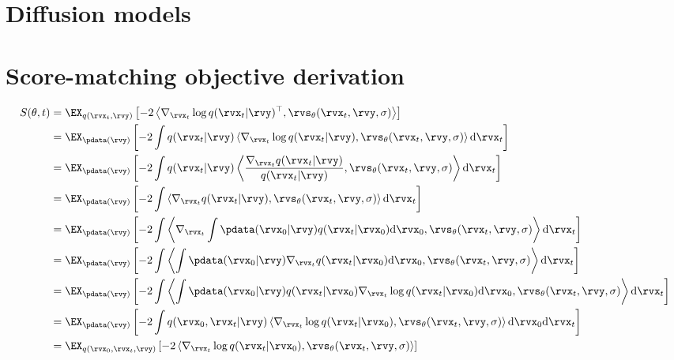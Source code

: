 \chapter{Diffusion models}

\chapter{Score-matching objective derivation} \label{sec:proof-that-diffusion-does-score-matching}

\begin{align}
\allowdisplaybreaks
S(\theta, t) &= \EX_{q(\rvx_t, \rvy)} \left[ - 2 \left\langle \nabla_{\rvx_t} \log q(\rvx_t|\rvy)^\top, \rvs_\theta(\rvx_t, \rvy, \sigma) \right\rangle \right] \\
    &= \EX_{\pdata(\rvy)}\left[  - 2 \int q(\rvx_t | \rvy) \left\langle \nabla_{\rvx_t} \log q(\rvx_t | \rvy), \rvs_\theta(\rvx_t, \rvy, \sigma) \right\rangle \mathrm{d} \rvx_t \right] \\
    &= \EX_{\pdata(\rvy)}\left[ - 2 \int q(\rvx_t | \rvy) \left\langle \frac{\nabla_{\rvx_t} q(\rvx_t|\rvy)}{q(\rvx_t | \rvy)}, \rvs_\theta(\rvx_t, \rvy, \sigma) \right\rangle \mathrm{d} \rvx_t \right] \\
    &= \EX_{\pdata(\rvy)}\left[  - 2 \int \left\langle \nabla_{\rvx_t} q(\rvx_t | \rvy), \rvs_\theta(\rvx_t, \rvy, \sigma) \right\rangle \mathrm{d} \rvx_t \right] \\
    &= \EX_{\pdata(\rvy)}\left[  - 2 \int \left\langle \nabla_{\rvx_t} \int \pdata(\rvx_0|\rvy) q(\rvx_t|\rvx_0) \mathrm{d}\rvx_0, \rvs_\theta(\rvx_t, \rvy, \sigma) \right\rangle \mathrm{d} \rvx_t \right] \\
    &= \EX_{\pdata(\rvy)}\left[  - 2 \int \left\langle \int \pdata(\rvx_0|\rvy) \nabla_{\rvx_t} q(\rvx_t|\rvx_0) \mathrm{d}\rvx_0, \rvs_\theta(\rvx_t, \rvy, \sigma) \right\rangle \mathrm{d} \rvx_t \right] \\
    &= \EX_{\pdata(\rvy)}\left[  - 2 \int \left\langle \int \pdata(\rvx_0|\rvy) q(\rvx_t|\rvx_0) \nabla_{\rvx_t} \log q(\rvx_t|\rvx_0) \mathrm{d}\rvx_0, \rvs_\theta(\rvx_t, \rvy, \sigma) \right\rangle \mathrm{d} \rvx_t \right] \\
    &= \EX_{\pdata(\rvy)}\left[  - 2 \int q(\rvx_0, \rvx_t|\rvy) \left\langle \nabla_{\rvx_t} \log q(\rvx_t|\rvx_0), \rvs_\theta(\rvx_t, \rvy, \sigma) \right\rangle  \mathrm{d}\rvx_0 \mathrm{d} \rvx_t \right] \\
    &= \EX_{q(\rvx_0, \rvx_t, \rvy)} \left[ -2 \left\langle \nabla_{\rvx_t} \log q(\rvx_t|\rvx_0), \rvs_\theta(\rvx_t, \rvy, \sigma) \right\rangle  \right]
\end{align}
